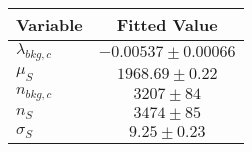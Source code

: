 \begin{tabular}[t]{lc}
\hline
Variable &Fitted Value\\
\hline\hline
$\lambda_{bkg,c}$&$-0.00537\pm0.00066$\\
\hline
$\mu_{S}$&$1968.69\pm0.22$\\
\hline
$n_{bkg,c}$&$3207\pm84$\\
\hline
$n_{S}$&$3474\pm85$\\
\hline
$\sigma_{S}$&$9.25\pm0.23$\\
\hline
\end{tabular}